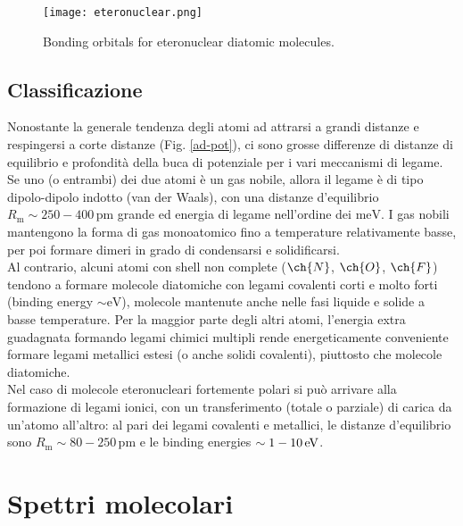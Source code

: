 \begin{figure}
	\centering
	\texttt{[image: eteronuclear.png]}
	\caption{Bonding orbitals for eteronuclear diatomic molecules.}
	\label{etero}
\end{figure}

\subsection{Classificazione}

Nonostante la generale tendenza degli atomi ad attrarsi a grandi distanze e respingersi a corte distanze (Fig. \ref{ad-pot}), ci sono grosse differenze di distanze di equilibrio e profondità della buca di potenziale per i vari meccanismi di legame. \\
Se uno (o entrambi) dei due atomi è un gas nobile, allora il legame è di tipo dipolo-dipolo indotto (van der Waals), con una distanze d'equilibrio $ R_\text{m} \sim 250-400 \,\text{pm} $ grande ed energia di legame nell'ordine dei $ \text{meV} $. I gas nobili mantengono la forma di gas monoatomico fino a temperature relativamente basse, per poi formare dimeri in grado di condensarsi e solidificarsi. \\
Al contrario, alcuni atomi con shell non complete ($ \ch{N} $, $ \ch{O} $, $ \ch{F} $) tendono a formare molecole diatomiche con legami covalenti corti e molto forti (binding energy $ \sim \text{eV} $), molecole mantenute anche nelle fasi liquide e solide a basse temperature. Per la maggior parte degli altri atomi, l'energia extra guadagnata formando legami chimici multipli rende energeticamente conveniente formare legami metallici estesi (o anche solidi covalenti), piuttosto che molecole diatomiche.\\
Nel caso di molecole eteronucleari fortemente polari si può arrivare alla formazione di legami ionici, con un transferimento (totale o parziale) di carica da un'atomo all'altro: al pari dei legami covalenti e metallici, le distanze d'equilibrio sono $ R_\text{m} \sim 80-250 \,\text{pm} $ e le binding energies $ \sim 1-10\,\mathrm{eV} $.

\section{Spettri molecolari}

